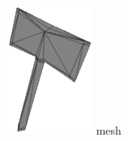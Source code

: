 \begin{frame}
\begin{columns}
\begin{column}[b]{0.22\textwidth}
\begin{center}
				\includegraphics[width=\textwidth]{./img/2_mesh/sharpAxeMesh.png}
				\small{mesh}
			\end{center}	
		\end{column}
		\begin{column}[b]{0.22\textwidth}
			\begin{center}

\end{center}
\end{column}
\end{columns}
\end{frame}

